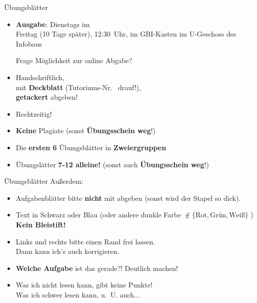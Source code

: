 \begin{frame}{Übungsblätter}
	\begin{itemize}
		\item \textbf{Ausgabe}: Dienstags im \ILIAS \\
			   Freitag (10 Tage später), 12:30~Uhr, im GBI-Kasten im U-Geschoss des Infobaus
		\pause
		\begin{block}{Frage}
			 Möglichkeit zur online Abgabe?
		\end{block}
		\item Handschriftlich, \\ 
		mit \textbf{Deckblatt} (Tutoriums-Nr. \mytutnumber\  drauf!), \\ 
		\textbf{getackert} abgeben!
		\item Rechtzeitig! 
		\item \textbf{Keine} Plagiate (sonst \textbf{Übungsschein weg}!)
		\item Die \textbf{ersten 6} Übungsblätter in \textbf{Zweiergruppen}
		\item Übungslätter \textbf{7-12 alleine!} (sonst auch \textbf{Übungsschein weg}!)
	\end{itemize}
\end{frame}

\begin{frame}{Übungsblätter}
	Außerdem:
	\begin{itemize}
		\item Aufgabenblätter bitte \textbf{nicht} mit abgeben (sonst wird der Stapel so dick).
		\item Text in Schwarz oder Blau (oder andere dunkle Farbe $\notin \{\text{Rot}, \text{Grün}, \text{Weiß}\}$ ) \\
			  \textbf{Kein Bleistift!}
		\item Links und rechts bitte einen Rand frei lassen. \\
			  Dann kann ich's auch korrigieren. \smiley
		\item \textbf{Welche Aufgabe} ist das gerade?! \impl Deutlich machen!
		\item Was ich nicht lesen kann, gibt keine Punkte! \\
			  \small Was ich schwer lesen kann, u.~U. auch... 
	\end{itemize}
\end{frame}



